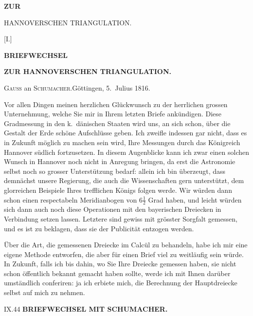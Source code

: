 \vspace*{40mm}
\begin{center}
{\Large\bfseries ZUR\par\medskip HANNOVERSCHEN TRIANGULATION.}
\end{center}
\clearpage\null\clearpage
\begin{center}
[I.]\par\medskip
{\Large\bfseries BRIEFWECHSEL}\par\medskip
{\bfseries ZUR HANNOVERSCHEN TRIANGULATION.}\par\bigskip
[1.]\par\medskip
\textsc{Gauss} an \textsc{Schumacher}.\quad Göttingen, 5.~Julius 1816.
\end{center}

\par\noindent\hspace*{\parindent}Vor allen Dingen meinen herzlichen Glückwunsch zu der herrlichen grossen Unternehmung, welche Sie mir in Ihrem letzten Briefe ankündigen. Diese Gradmessung in den k.~dänischen Staaten wird uns, an sich schon, über die Gestalt der Erde schöne Aufschlüsse geben. Ich zweifle indessen gar nicht, dass es in Zukunft möglich zu machen sein wird, Ihre Messungen durch das Königreich Hannover südlich fortzusetzen. In diesem Augenblicke kann ich zwar einen solchen Wunsch in Hannover noch nicht in Anregung bringen, da erst die Astronomie selbst noch so grosser Unterstützung bedarf: allein ich bin überzeugt, dass demnächst unsere Regierung, die auch die Wissenschaften gern unterstützt, dem glorreichen Beispiele Ihres trefflichen Königs folgen werde. Wir würden dann schon einen respectabeln Meridianbogen von \(6\frac{1}{2}\) Grad haben, und leicht würden sich dann auch noch diese Operationen mit den bayerischen Dreiecken in Verbindung setzen lassen. Letztere sind gewiss mit grösster Sorgfalt gemessen, und es ist zu beklagen, dass sie der Publicität entzogen werden.

\par\noindent\hspace*{\parindent}Über die Art, die gemessenen Dreiecke im Calcül zu behandeln, habe ich mir eine eigene Methode entworfen, die aber für einen Brief viel zu weitläufig sein würde. In Zukunft, falls ich bis dahin, wo Sie Ihre Dreiecke gemessen haben, sie nicht schon öffentlich bekannt gemacht haben sollte, werde ich mit Ihnen darüber umständlich conferiren: ja ich erbiete mich, die Berechnung der Hauptdreiecke selbst auf mich zu nehmen.
\par\medskip\noindent IX.\hfill44
\clearpage
{}\hfill{\small\textbf{BRIEFWECHSEL MIT SCHUMACHER.}}\par\medskip

